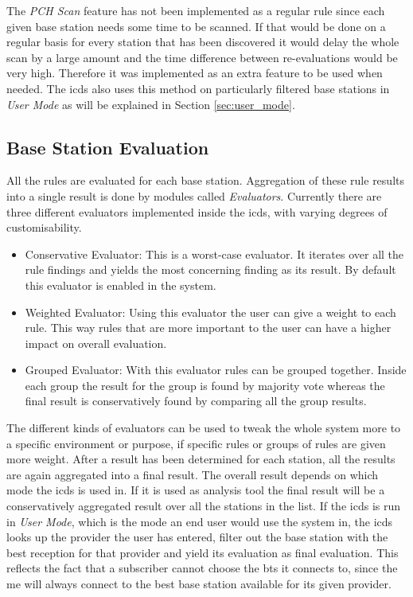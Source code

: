 The \emph{PCH Scan} feature has not been implemented as a regular rule since each given base station needs some time to be scanned.
If that would be done on a regular basis for every station that has been discovered it would delay the whole scan by a large amount and the time difference between re-evaluations would be very high.
Therefore it was implemented as an extra feature to be used when needed.
The \gls{icds} also uses this method on particularly filtered base stations in \emph{User Mode} as will be explained in Section \ref{sec:user_mode}.

\subsection{Base Station Evaluation}
\label{sec:evaluators}
All the rules are evaluated for each base station.
Aggregation of these rule results into a single result is done by modules called \emph{Evaluators}.
Currently there are three different evaluators implemented inside the \gls{icds}, with varying degrees of customisability.
\begin{itemize}
	\item Conservative Evaluator: This is a worst-case evaluator.
	It iterates over all the rule findings and yields the most concerning finding as its result.
	By default this evaluator is enabled in the system.
	\item Weighted Evaluator: Using this evaluator the user can give a weight to each rule.
	This way rules that are more important to the user can have a higher impact on overall evaluation.
	\item Grouped Evaluator: With this evaluator rules can be grouped together.
	Inside each group the result for the group is found by majority vote whereas the final result is conservatively found by comparing all the group results.
\end{itemize}
The different kinds of evaluators can be used to tweak the whole system more to a specific environment or purpose, if specific rules or groups of rules are given more weight.
After a result has been determined for each station, all the results are again aggregated into a final result.
The overall result depends on which mode the \gls{icds} is used in.
If it is used as analysis tool the final result will be a conservatively aggregated result over all the stations in the list.
If the \gls{icds} is run in \emph{User Mode}, which is the mode an end user would use the system in, the \gls{icds} looks up the provider the user has entered, filter out the base station with the best reception for that provider and yield its evaluation as final evaluation.
This reflects the fact that a subscriber cannot choose the \gls{bts} it connects to, since the \gls{me} will always connect to the best base station available for its given provider.

